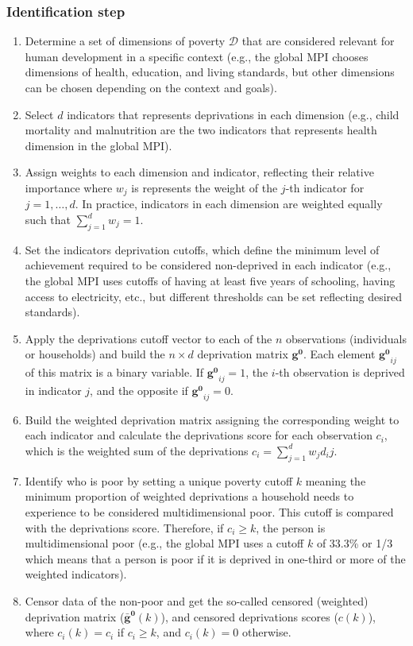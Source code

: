 \hypertarget{identification-step}{%
\subsubsection{Identification step}\label{identification-step}}

\begin{enumerate}
\item Determine a set of dimensions of poverty $\mathcal{D}$ that are considered relevant for human development in a specific context (e.g., the global MPI chooses dimensions of health, education, and living standards, but other dimensions can be chosen depending on the context and goals).
\item Select $d$ indicators that represents deprivations in each dimension (e.g., child mortality and malnutrition are the two indicators that represents health dimension in the global MPI).  
\item Assign weights to each dimension and indicator, reflecting their relative importance where $w_j$ is represents the weight of the $j$-th indicator for $j = 1,\ldots,d$. In practice, indicators in each dimension are weighted equally such that $\sum_{j=1}^d w_j = 1$.
\item Set the indicators deprivation cutoffs, which define the minimum level of achievement required to be considered non-deprived in each indicator (e.g., the global MPI uses cutoffs of having at least five years of schooling, having access to electricity, etc., but different thresholds can be set reflecting desired standards). 
\item Apply the deprivations cutoff vector to each of the $n$ observations (individuals or households) and build the $n \times d$ deprivation matrix $\mathbf{g^0}$. Each element $\mathbf{g^0}_{ij}$ of this matrix is a binary variable. If $\mathbf{g^0}_{ij} = 1$, the $i$-th observation is deprived in indicator $j$, and the opposite if $\mathbf{g^0}_{ij} = 0$. 
\item Build the weighted deprivation matrix assigning the corresponding weight to each indicator and calculate the deprivations score for each observation $c_i$, which is the weighted sum of the deprivations $c_i = \sum_{j=1}^d w_j d_ij$.
\item Identify who is poor by setting a unique poverty cutoff $k$ meaning the minimum proportion of weighted deprivations a household needs to experience to be considered multidimensional poor. This cutoff is compared with the deprivations score. Therefore, if $c_i \geq k$, the person is multidimensional poor (e.g., the global MPI uses a cutoff $k$ of 33.3\% or 1/3 which means that a person is poor if it is deprived in one-third or more of the weighted indicators).
\item Censor data of the non-poor and get the so-called censored (weighted) deprivation matrix ($\mathbf{\bar{g}^0}(k)$), and censored deprivations scores ($c(k)$), where $c_i(k) = c_i$ if $c_i \geq k $, and $c_i(k) = 0$ otherwise.
\end{enumerate}

